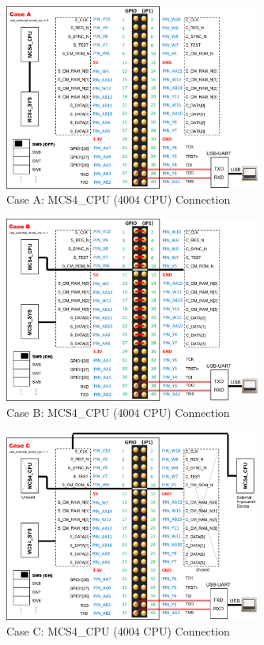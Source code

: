 \begin{figure}[htbp]
  \includegraphics[width=0.75\textwidth]{./Figure/FPGACASEA.png}
  \caption{Case A:  MCS4\_CPU (4004 CPU) Connection}
  \label{fig:FPGACASEA}
\end{figure}
\begin{figure}[htbp]
  \includegraphics[width=0.75\textwidth]{./Figure/FPGACASEB.png}
  \caption{Case B:  MCS4\_CPU (4004 CPU) Connection}
  \label{fig:FPGACASEB}
\end{figure}
\begin{figure}[htbp]
  \includegraphics[width=0.75\textwidth]{./Figure/FPGACASEC.png}
  \caption{Case C:  MCS4\_CPU (4004 CPU) Connection}
  \label{fig:FPGACASEC}
\end{figure}

